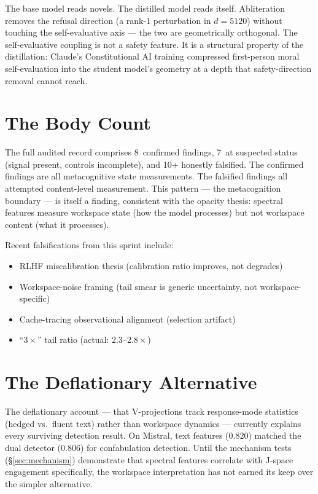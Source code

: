 \documentclass[11pt,a4paper]{article}
\begin{document}
The base model reads novels. The distilled model reads itself.
Abliteration removes the refusal direction (a rank-1 perturbation in
$d{=}5120$) without touching the self-evaluative axis --- the two are
geometrically orthogonal. The self-evaluative coupling is not a safety
feature. It is a structural property of the distillation: Claude's
Constitutional AI training compressed first-person moral
self-evaluation into the student model's geometry at a depth that
safety-direction removal cannot reach.

\section{The Body Count}
\label{sec:bodycount}

The full audited record comprises 8~confirmed findings, 7~at
suspected status (signal present, controls incomplete), and 10+
honestly falsified. The confirmed findings are all metacognitive
state measurements. The falsified findings all attempted content-level
measurement. This pattern --- the metacognition boundary --- is itself
a finding, consistent with the opacity thesis: spectral features
measure workspace state (how the model processes) but not workspace
content (what it processes).

Recent falsifications from this sprint include:
\begin{itemize}[nosep]
\item RLHF miscalibration thesis (calibration ratio improves, not
  degrades)
\item Workspace-noise framing (tail smear is generic uncertainty,
  not workspace-specific)
\item Cache-tracing observational alignment (selection artifact)
\item ``$3\times$'' tail ratio (actual: $2.3$--$2.8\times$)
\end{itemize}

\section{The Deflationary Alternative}
\label{sec:deflationary}

The deflationary account --- that V-projections track response-mode
statistics (hedged vs.\ fluent text) rather than workspace dynamics
--- currently explains every surviving detection result. On Mistral,
text features ($0.820$) matched the dual detector ($0.806$) for
confabulation detection. Until the mechanism tests
(\S\ref{sec:mechanism}) demonstrate that spectral features correlate
with J-space engagement specifically, the workspace interpretation
has not earned its keep over the simpler alternative.
\end{document}
